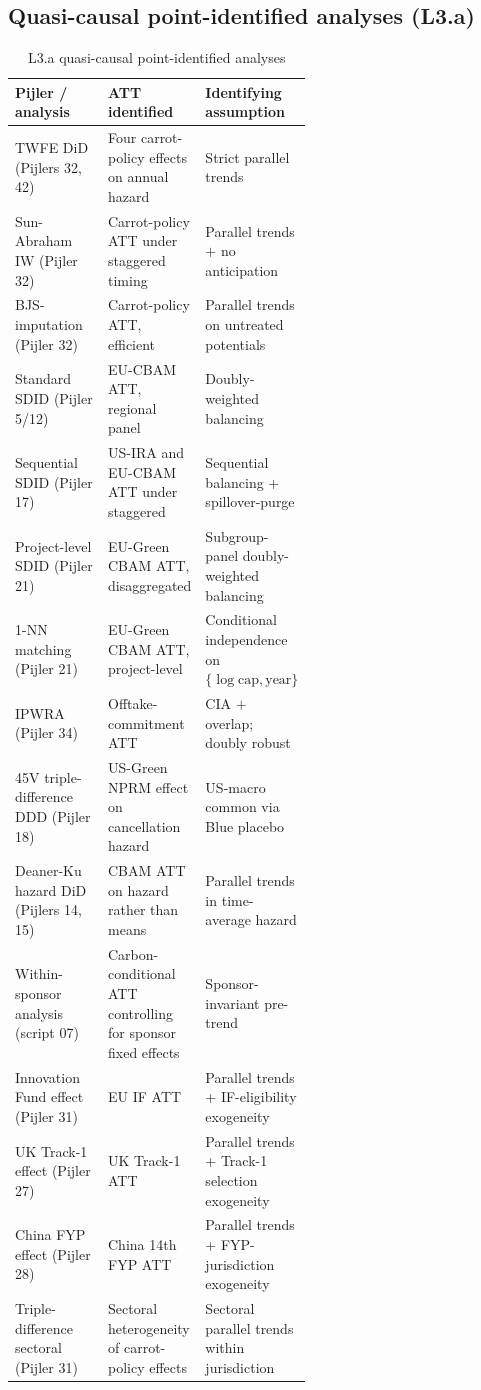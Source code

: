 \subsection*{Quasi-causal point-identified analyses (L3.a)}

\begin{table}[!htbp]
\centering
\caption{L3.a quasi-causal point-identified analyses}
\label{tab:app-id-L3a}
\small
\begin{tabular}{lp{0.27\linewidth}p{0.32\linewidth}}
\toprule
Pijler / analysis & ATT identified & Identifying assumption \\
\midrule
TWFE DiD (Pijlers 32, 42) & Four carrot-policy effects on annual hazard & Strict parallel trends \\
Sun-Abraham IW (Pijler 32) & Carrot-policy ATT under staggered timing & Parallel trends $+$ no anticipation \\
BJS-imputation (Pijler 32) & Carrot-policy ATT, efficient & Parallel trends on untreated potentials \\
Standard SDID (Pijler 5/12) & EU-CBAM ATT, regional panel & Doubly-weighted balancing \\
Sequential SDID (Pijler 17) & US-IRA and EU-CBAM ATT under staggered & Sequential balancing + spillover-purge \\
Project-level SDID (Pijler 21) & EU-Green CBAM ATT, disaggregated & Subgroup-panel doubly-weighted balancing \\
1-NN matching (Pijler 21) & EU-Green CBAM ATT, project-level & Conditional independence on $\{\log\text{cap}, \text{year}\}$ \\
IPWRA (Pijler 34) & Offtake-commitment ATT & CIA $+$ overlap; doubly robust \\
45V triple-difference DDD (Pijler 18) & US-Green NPRM effect on cancellation hazard & US-macro common via Blue placebo \\
Deaner-Ku hazard DiD (Pijlers 14, 15) & CBAM ATT on hazard rather than means & Parallel trends in time-average hazard \\
Within-sponsor analysis (script 07) & Carbon-conditional ATT controlling for sponsor fixed effects & Sponsor-invariant pre-trend \\
Innovation Fund effect (Pijler 31) & EU IF ATT & Parallel trends + IF-eligibility exogeneity \\
UK Track-1 effect (Pijler 27) & UK Track-1 ATT & Parallel trends + Track-1 selection exogeneity \\
China FYP effect (Pijler 28) & China 14th FYP ATT & Parallel trends + FYP-jurisdiction exogeneity \\
Triple-difference sectoral (Pijler 31) & Sectoral heterogeneity of carrot-policy effects & Sectoral parallel trends within jurisdiction \\
\bottomrule
\end{tabular}
\end{table}

